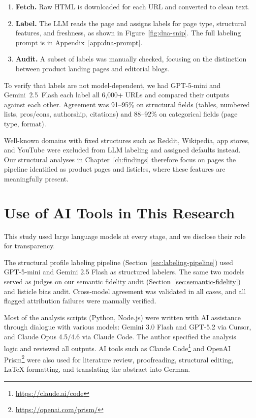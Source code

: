 \begin{enumerate}
    \item \textbf{Fetch.} Raw HTML is downloaded for each URL and converted to clean text.
    \item \textbf{Label.} The LLM reads the page and assigns labels for page type, structural features, and freshness, as shown in Figure~\ref{fig:dna-snip}. The full labeling prompt is in Appendix~\ref{app:dna-prompt}.
    \item \textbf{Audit.} A subset of labels was manually checked, focusing on the distinction between product landing pages and editorial blogs.
\end{enumerate}

To verify that labels are not model-dependent, we had GPT-5-mini and Gemini~2.5~Flash each label all 6{,}000+ URLs and compared their outputs against each other. Agreement was 91--95\% on structural fields (tables, numbered lists, pros/cons, authorship, citations) and 88--92\% on categorical fields (page type, format).

Well-known domains with fixed structures such as Reddit, Wikipedia, app stores, and YouTube were excluded from LLM labeling and assigned defaults instead. Our structural analyses in Chapter~\ref{ch:findings} therefore focus on pages the pipeline identified as product pages and listicles, where these features are meaningfully present.

\section{Use of AI Tools in This Research}
\label{sec:ai-tools-disclosure}

This study used large language models at every stage, and we disclose their role for transparency.

The structural profile labeling pipeline (Section~\ref{sec:labeling-pipeline}) used GPT-5-mini and Gemini 2.5 Flash as structured labelers. 
The same two models served as judges on our semantic fidelity audit (Section~\ref{sec:semantic-fidelity}) and listicle bias audit. Cross-model agreement was validated in all cases, and all flagged attribution failures were manually verified.

Most of the analysis scripts (Python, Node.js) were written with AI assistance through dialogue with various models: Gemini 3.0 Flash and GPT-5.2 via Cursor, and Claude Opus 4.5/4.6 via Claude Code. The author specified the analysis logic and reviewed all outputs. AI tools such as Claude Code\footnote{\url{https://claude.ai/code}} and OpenAI Prism\footnote{\url{https://openai.com/prism/}} were also used for literature review, proofreading, structural editing, \LaTeX{} formatting, and translating the abstract into German.

